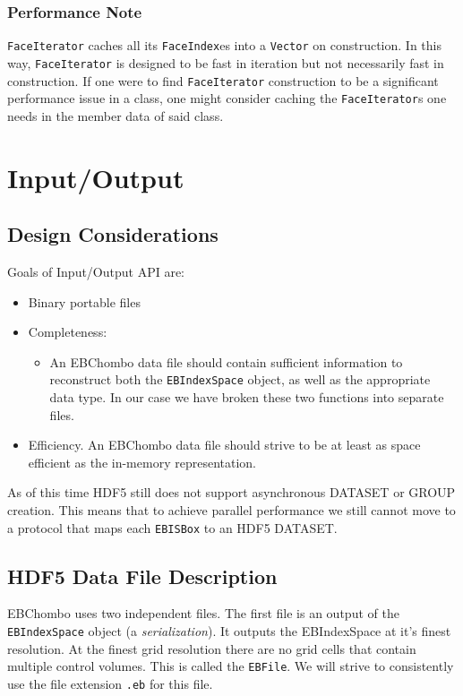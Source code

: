 \subsubsection{Performance Note}
{\tt FaceIterator} caches all its {\tt FaceIndex}es
into a {\tt Vector} on construction.  
In this way, {\tt FaceIterator} is
designed to be fast in iteration but not
necessarily fast in construction.  If one
were to find {\tt FaceIterator} construction
to be a significant performance issue
in a class, one might consider caching the {\tt FaceIterator}s
one needs in the member data of said class.


\section{Input/Output}

\subsection{Design Considerations}

Goals of Input/Output API are:

\begin{itemize}
\item Binary portable files
\item Completeness:
    \begin{itemize}
    \item An EBChombo data file should contain sufficient information
    to reconstruct both the {\tt EBIndexSpace} object, as well as the 
    appropriate data type.  In our case we have broken these two functions
    into separate files.
    \end{itemize}
\item Efficiency.  An EBChombo data file should strive to be at least as space
efficient as the in-memory representation.
\end{itemize}

  As of this time HDF5 still does not support asynchronous DATASET or GROUP creation.
This means that to achieve parallel performance we still cannot move to a protocol
that maps each {\tt EBISBox} to an HDF5 DATASET. 


\subsection{HDF5 Data File Description}

EBChombo uses two independent files.  The first file is an output of
the {\tt EBIndexSpace} object (a {\em serialization}). It outputs the 
EBIndexSpace at it's finest resolution.  At the finest grid resolution there
are no grid cells that contain multiple control volumes.  This is called the {\tt EBFile}.
We will strive to consistently use the file extension {\tt .eb} for this file.

